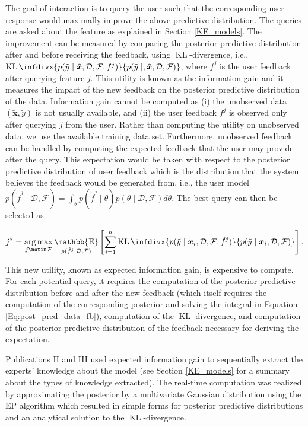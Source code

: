 \documentclass[dissertation,math,vertlayout,pdfa,colorlinks]{aaltoseries}
\newcommand{\bD}{\mathcal{D}}
\newcommand{\bF}{\mathcal{F}}
\DeclareMathOperator{\KLt}{KL}
\newcommand{\KL}{\KLt\infdivx}
\DeclareMathOperator{\E}{\mathbb{E}}
\DeclareMathOperator*{\argmax}{arg\,max}
\begin{document}
The goal of interaction is to query the user such that the corresponding user response would maximally improve the above predictive distribution. The queries are asked about the feature as explained in Section \ref{KE_models}. %
The improvement can be measured by comparing the posterior predictive distribution after and before receiving the feedback, using $\KLt$-divergence, i.e., $\KL{p(\tilde{y} \mid \tilde{\bm{x}}, \bD,\bF,f^{j})} {p(\tilde{y} \mid, \tilde{\bm{x}}, \bD,\bF)}$, where $f^{j}$ is the user feedback after querying feature $j$. This utility is known as the information gain and it measures the impact of the new feedback on the posterior predictive distribution of the data. Information gain cannot be computed as (i) the unobserved data $(\tilde{\bm{x}},\tilde{y})$ is not usually available, and (ii) the user feedback $f^{j}$ is observed only after querying $j$ from the user. Rather than computing the utility on unobserved data, we use the available training data set. Furthermore, unobserved feedback can be handled by computing the expected feedback that the user may provide after the query. This expectation would be taken with respect to the posterior predictive distribution of user feedback which is the distribution that the system believes the feedback would be generated from, i.e., the user model $p(\tilde{f}^j \mid \bD,\bF)= \int_{\theta} p(\tilde{f}^j \mid \theta)p(\theta \mid \bD, \bF)d\theta$. The best query can then be  selected as

\begin{equation}\label{Eq:expected_info_gain}
j^* = \argmax_{j \notin \bF} \E_{p(\tilde{f}^j \mid \bD,\bF)} \left[ \sum_{i=1}^{n}  \KL{p(\tilde{y}\mid \bm{x}_i, \bD,\bF,\tilde{f}^j)} {p(\tilde{y} \mid \bm{x}_i, \bD,\bF)} \right].
\end{equation}
    
This new utility, known as expected information gain, is expensive to compute. For each potential query, it requires the computation of the posterior predictive distribution before and after the new feedback (which itself requires the computation of the corresponding posterior and solving the integral in Equation \ref{Eq:post_pred_data_fb}), computation of the $\KLt$-divergence, and computation of the posterior predictive distribution of the feedback necessary for deriving the expectation. 


Publications II and III used expected information gain to sequentially extract the experts' knowledge about the model (see Section \ref{KE_models} for a summary about the types of knowledge extracted). The real-time computation was realized by approximating the posterior by a multivariate Gaussian distribution using the EP algorithm which resulted in simple forms for posterior predictive distributions and an analytical solution to the $\KLt$-divergence.   
\end{document}
